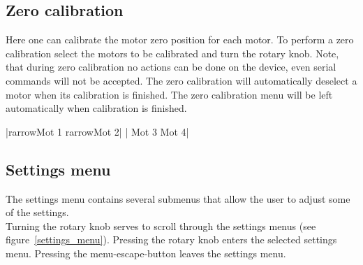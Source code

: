 \subsection{Zero calibration}
\label{menu_zero_cal}
Here one can calibrate the motor zero position for each motor. To perform a zero calibration select the motors to be calibrated and turn the rotary knob. Note, that during zero calibration no actions can be done on the device, even serial commands will not be accepted. The zero calibration will automatically deselect a motor when its calibration is finished. The zero calibration menu will be left automatically when calibration is finished.
\begin{center}
  |{rarrow}Mot 1  {rarrow}Mot 2|
             | Mot 3   Mot 4|
\end{center}

\subsection{Settings menu}
\label{menu_settings}
The settings menu contains several submenus that allow the user to adjust some of the settings.\\
Turning the rotary knob serves to scroll through the settings menus (see figure~\ref{settings_menu}). Pressing the rotary knob enters the selected settings menu. Pressing the menu-escape-button leaves the settings menu.

